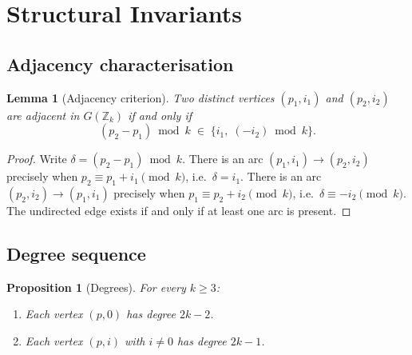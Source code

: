 \documentclass[12pt]{article}
\newtheorem{lemma}[theorem]{Lemma}
\newtheorem{proposition}[theorem]{Proposition}
\theoremstyle{definition}
\theoremstyle{remark}
\newcommand{\Z}{\mathbb{Z}}
\newcommand{\GZk}{G(\Z_k)}
\begin{document}
\section{Structural Invariants}
\label{sec:structure}

\subsection{Adjacency characterisation}

\begin{lemma}[Adjacency criterion]
\label{lem:adj}
Two distinct vertices $(p_1, i_1)$ and $(p_2, i_2)$ are adjacent in $\GZk$
if and only if
\[
  (p_2 - p_1) \bmod k \;\in\; \{i_1,\; (-i_2) \bmod k\}.
\]
\end{lemma}

\begin{proof}
Write $\delta = (p_2 - p_1) \bmod k$.  There is an arc $(p_1, i_1) \to (p_2, i_2)$
precisely when $p_2 \equiv p_1 + i_1 \pmod{k}$, i.e.\ $\delta = i_1$.
There is an arc $(p_2, i_2) \to (p_1, i_1)$ precisely when
$p_1 \equiv p_2 + i_2 \pmod{k}$, i.e.\ $\delta \equiv -i_2 \pmod{k}$.
The undirected edge exists if and only if at least one arc is present.
\end{proof}

\subsection{Degree sequence}

\begin{proposition}[Degrees]
\label{prop:deg}
For every $k \ge 3$:
\begin{enumerate}[label=(\alph*)]
  \item Each vertex $(p, 0)$ has degree $2k - 2$.
  \item Each vertex $(p, i)$ with $i \ne 0$ has degree $2k - 1$.
\end{enumerate}
\end{proposition}
\end{document}
